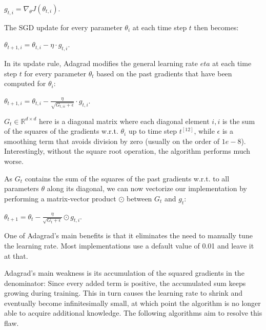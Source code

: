\documentclass[4pt,journal,compsoc]{IEEEtran}
\begin{document}
\begin{flushleft}
    $g_{t, i} = \nabla_\theta J(\theta_{t, i})$. \newline
    
    The SGD update for every parameter $\theta_i$ at each time step $t$ then becomes: \newline
    
    $\theta_{t+1, i} = \theta_{t, i} - \eta \cdot g_{t, i}$. \newline
    
    In its update rule, Adagrad modifies the general learning rate $eta$ at each time step $t$ for every parameter $\theta_t$ based on the past gradients that have been computed for $\theta_i$: \newline
    
    $\theta_{t+1, i} = \theta_{t, i} - \frac{\eta}{\sqrt{G_{t, ii} + \epsilon}} \cdot g_{t, i}$. \newline
    
    $G_t \in \mathbb{R} ^ {d \times d}$ here is a diagonal matrix where each diagonal element $i, i$ is the sum of the squares of the gradients w.r.t. $\theta_i$ up to time step $t ^ {[12]}$, while $\epsilon$ is a smoothing term that avoids division by zero (usually on the order of $1e-8$). Interestingly, without the square root operation, the algorithm performs much worse. \newline
    
    As $G_t$ contains the sum of the squares of the past gradients w.r.t. to all parameters $\theta$ along its diagonal, we can now vectorize our implementation by performing a matrix-vector product $\odot$ between $G_t$ and $g_t$: \newline
    
    $\theta_{t + 1} = \theta_t - \frac{\eta}{\sqrt{G_t + \epsilon}} \odot g_{t, i}$. \newline
    
    One of Adagrad's main benefits is that it eliminates the need to manually tune the learning rate. Most implementations use a default value of 0.01 and leave it at that. \newline

    Adagrad's main weakness is its accumulation of the squared gradients in the denominator: Since every added term is positive, the accumulated sum keeps growing during training. This in turn causes the learning rate to shrink and eventually become infinitesimally small, at which point the algorithm is no longer able to acquire additional knowledge. The following algorithms aim to resolve this flaw. \newline \newline
    

\end{flushleft}
\end{document}
